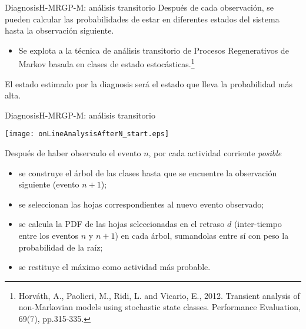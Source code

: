 \documentclass[9pt, handout]{beamer}
\begin{document}
      \begin{frame}{Diagnosis}{H-MRGP-M: análisis transitorio}
        \pause
        Después de cada observación, se pueden calcular las probabilidades de estar en diferentes estados del sistema hasta la observación siguiente.
        \pause
        \begin{itemize}
          \item Se explota a la técnica de análisis transitorio de Procesos Regenerativos de Markov basada en clases de estado estocásticas.\footnote{Horváth, A., Paolieri, M., Ridi, L. and Vicario, E., 2012. Transient analysis of non-Markovian models using stochastic state classes. Performance Evaluation, 69(7), pp.315-335.}
        \end{itemize}
        
        \pause
        
        \pause
        El estado estimado por la diagnosis será el estado que lleva la probabilidad más alta.
      \end{frame}
      
      \begin{frame}{Diagnosis}{H-MRGP-M: análisis transitorio}
        \begin{center}
          \texttt{[image: onLineAnalysisAfterN\_start.eps]}
        \end{center}
        
        \pause
        Después de haber observado el evento $n$, por cada actividad corriente \textit{posible}
        \pause
        \begin{itemize}
          \item se construye el árbol de las clases hasta que se encuentre la observación siguiente (evento $n+1$);
          \pause
          \item se seleccionan las hojas correspondientes al nuevo evento observado;
          \pause
          \item se calcula la PDF de las hojas seleccionadas en el retraso $d$ (inter-tiempo entre los eventos $n$ y $n+1$) en cada árbol, sumandolas entre sí con peso la probabilidad de la raíz;
          \pause
          \item se restituye el máximo como actividad más probable.
        \end{itemize}
      \end{frame}
      
\end{document}
